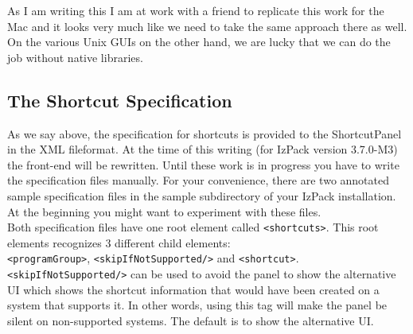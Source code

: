 As I am writing this I am at work with a friend to replicate this work
for the Mac and it looks very much like we need to take the same
approach there as well. On the various Unix GUIs on the other hand, we are lucky that we
can do the job without native libraries.\\

\subsection{The Shortcut Specification}

As we say above, the specification for shortcuts is provided to the ShortcutPanel in the
XML fileformat. At the time of this writing (for IzPack version 3.7.0-M3)
the front-end will be rewritten. Until these work is in progress
you have to write the specification files manually. For your convenience, there are two annotated sample
specification files in the sample subdirectory of your IzPack installation. At the beginning you might want to experiment with these files.\\

Both specification files have one root element called \texttt{<shortcuts>}.
This root elements recognizes 3 different child elements:\\
\texttt{<programGroup>}, \texttt{<skipIfNotSupported/>} and \texttt{<shortcut>}.\\

\texttt{<skipIfNotSupported/>} can be used to avoid the panel to show the alternative UI which shows the shortcut information
that would have been created on a system that supports it. In other words,
using this tag will make the panel be silent on non-supported systems. The
default is to show the alternative UI.\\

